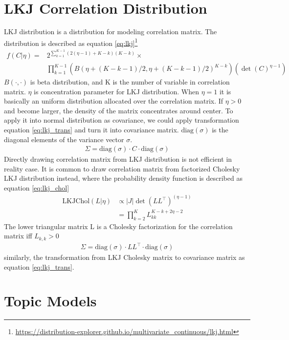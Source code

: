 \section{LKJ Correlation Distribution} \label{ch2:lkj}
LKJ distribution \cite{lewandowski_generating_2009} is a distribution for modeling correlation matrix. The distribution is described as equation \ref{eq:lkj}\footnote{\url{https://distribution-explorer.github.io/multivariate_continuous/lkj.html}}
\begin{align} \label{eq:lkj}
f(C|\eta)=&2^{\sum_{k=1}^{K-1}(2(\eta-1)+K-k)(K-k)}\times\\
&\prod_{k=1}^{K-1}(B(\eta+(K-k-1)/2,\eta+(K-k-1)/2)^{K-k})(\det(C)^{\eta-1})
\end{align}
$ B(\cdot,\cdot) $ is beta distribution, and K is the number of variable in correlation matrix. $ \eta $ is concentration parameter for LKJ distribution. When $ \eta=1 $ it is basically an uniform distribution allocated over the correlation matrix. If $ \eta>0 $ and become larger, the density of the matrix concentrates around center.
To apply it into normal distribution as covariance, we could apply transformation equation \ref{eq:lkj_trans} and turn it into covariance matrix\cite{barnard_modeling_2000}. $ \text{diag}(\sigma) $ is the diagonal elements of the variance vector $ \sigma $.
\begin{align}\label{eq:lkj_trans}
\Sigma=\text{diag}(\sigma)\cdot C \cdot \text{diag}(\sigma)
\end{align}
Directly drawing correlation matrix from LKJ distribution is not efficient in reality case. It is common to draw correlation matrix from factorized Cholesky LKJ distribution instead, where the probability density function is described as equation \ref{eq:lkj_chol}
\begin{align} \label{eq:lkj_chol}
\text{LKJChol}(L|\eta)&\propto|J|\det(LL^\top)^{(\eta-1)}\\
&=\prod_{k=2}^{K}L_{kk}^{K-k+2\eta-2}
\end{align}
The lower triangular matrix L is a Cholesky factorization for the correlation matrix iff $ L_{k,k}>0 $
\begin{align}
\Sigma=\text{diag}(\sigma)\cdot LL^\top \cdot \text{diag}(\sigma)
\end{align}
similarly, the transformation from LKJ Cholesky matrix to covariance matrix as equation \ref{eq:lkj_trans}.
\section{Topic Models}
